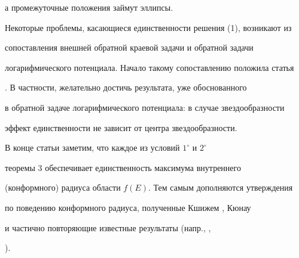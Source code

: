 а промежуточные положения займут эллипсы.





Некоторые проблемы, касающиеся единственности решения (1), возникают из


сопоставления внешней обратной краевой задачи и обратной задачи


логарифмического потенциала. Начало такому сопоставлению положила статья


\cite{4}. В частности, желательно достичь результата, уже обоснованного


в обратной задаче логарифмического потенциала: в случае звездообразности


эффект единственности не зависит от центра звездообразности.





В конце статьи заметим, что каждое из условий $1^\circ$ и $2^\circ$


теоремы 3 обеспечивает единственность максимума внутреннего


(конформного) радиуса области $f(E)$. Тем самым дополняются утверждения


по поведению конформного радиуса, полученные Кшижем \cite{9}, Кюнау


\cite{10} и частично повторяющие известные результаты (напр., \cite{1},


\cite{6}).





